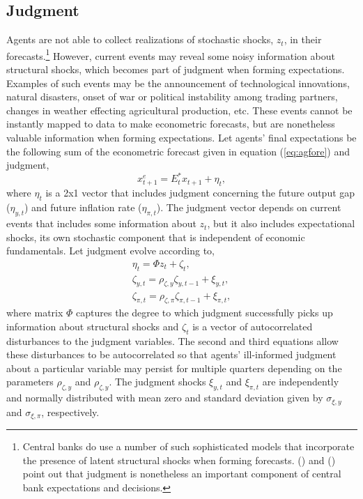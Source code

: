 \documentclass[12pt]{article}
\newcommand{\beq}{\begin{equation}}
\newcommand{\eeq}{\end{equation}}
\newcommand{\citee}[1]{\citename{#1} (\citeyear{#1})}
\newcommand{\ds}{\displaystyle}
\begin{document}
\subsection{Judgment}
Agents are not able to collect realizations of stochastic shocks, $z_t$, in their forecasts.\footnote{Central banks do use a number of such sophisticated models that incorporate the presence of latent structural shocks when forming forecasts.  \citee{rsw1997} and \citee{svensson2005} point out that judgment is nonetheless an important component of central bank expectations and decisions.}  However, current events may reveal some noisy information about structural shocks, which becomes part of judgment when forming expectations.  Examples of such events may be the announcement of technological innovations, natural disasters, onset of war or political instability among trading partners, changes in weather effecting agricultural production, etc.  These events cannot be instantly mapped to data to make econometric forecasts, but are nonetheless valuable information when forming expectations.  Let agents' final expectations be the following sum of the econometric forecast given in equation (\ref{eq:agfore}) and judgment,
\beq x_{t+1}^e = E_t^* x_{t+1} + \eta_{t}, \eeq
where $\eta_t$ is a 2x1 vector that includes judgment concerning the future output gap ($\eta_{y,t}$) and future inflation rate ($\eta_{\pi,t}$).  The judgment vector depends on current events that includes some information about $z_t$, but it also includes expectational shocks, its own stochastic component that is independent of economic fundamentals.  Let judgment evolve according to,
\beq \label{eq:news} \begin{array}{c} \ds \eta_t = \Phi z_t + \zeta_t, \\ [1pc]
 \ds \zeta_{y,t} = \rho_{\zeta,y} \zeta_{y,t-1} + \xi_{y,t}, \\ [1pc]
 \ds \zeta_{\pi,t} = \rho_{\zeta,\pi} \zeta_{\pi,t-1} + \xi_{\pi,t},
\end{array} \eeq
where matrix $\Phi$ captures the degree to which judgment successfully picks up information about structural shocks and $\zeta_t$ is a vector of autocorrelated disturbances to the judgment variables.  The second and third equations allow these disturbances to be autocorrelated so that agents' ill-informed judgment about a particular variable may persist for multiple quarters depending on the parameters $\rho_{\zeta,y}$ and $\rho_{\zeta,y}$.  The judgment shocks $\xi_{y,t}$ and $\xi_{\pi,t}$ are independently and normally distributed with mean zero and standard deviation given by $\sigma_{\xi,y}$ and $\sigma_{\xi,\pi}$, respectively.  
\end{document}

